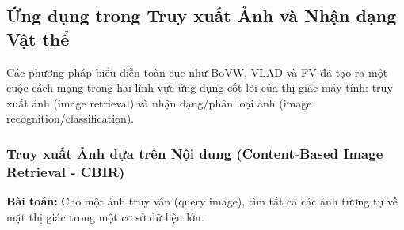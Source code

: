 \subsection{Ứng dụng trong Truy xuất Ảnh và Nhận dạng Vật thể}
\label{subsec:applications_retrieval_recognition}

Các phương pháp biểu diễn toàn cục như BoVW, VLAD và FV đã tạo ra một cuộc cách mạng trong hai lĩnh vực ứng dụng cốt lõi của thị giác máy tính: truy xuất ảnh (image retrieval) và nhận dạng/phân loại ảnh (image recognition/classification).

\subsubsection{Truy xuất Ảnh dựa trên Nội dung (Content-Based Image Retrieval - CBIR)}
\label{subsubsec:image_retrieval}
\textbf{Bài toán:} Cho một ảnh truy vấn (query image), tìm tất cả các ảnh tương tự về mặt thị giác trong một cơ sở dữ liệu lớn.

